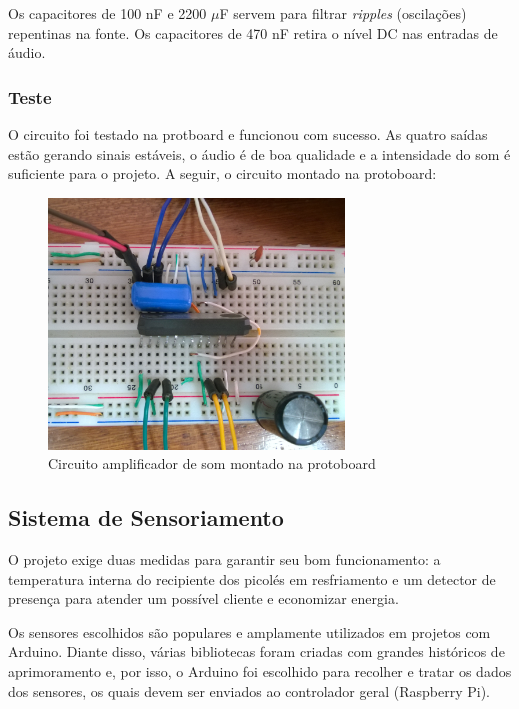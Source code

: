 Os capacitores de 100 nF e 2200 $\mu$F servem para filtrar \textit{ripples} (oscilações) repentinas na fonte. Os capacitores de 470 nF retira o nível DC nas entradas de áudio. 

\subsubsection{Teste}

O circuito foi testado na protboard e funcionou com sucesso. As quatro saídas estão gerando sinais estáveis, o áudio é de boa qualidade e a intensidade do som é suficiente para o projeto. A seguir, o circuito montado na protoboard:

\begin{figure}[H]
	\centering
    \includegraphics[width=0.7\textwidth]{figuras/Sistema_som_prot}
    \caption{Circuito amplificador de som montado na protoboard}
    \label{fig:Sistema_som_prot}
\end{figure}

\subsection{Sistema de Sensoriamento}

O projeto exige duas medidas para garantir seu bom funcionamento: a temperatura interna do recipiente dos picolés em resfriamento e um detector de presença para atender um possível cliente e economizar energia.

Os sensores escolhidos são populares e amplamente utilizados em projetos com Arduino. Diante disso, várias bibliotecas foram criadas com grandes históricos de aprimoramento e, por isso, o Arduino foi escolhido para recolher e tratar os dados dos sensores, os quais devem ser enviados ao controlador geral (Raspberry Pi).

